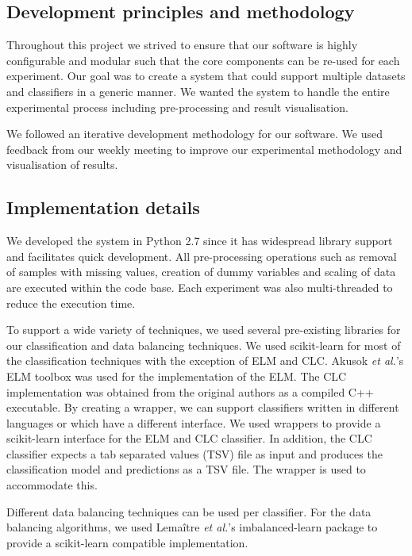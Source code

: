 \documentclass{sig-alternate-05-2015}
\begin{document}
	\subsection{Development principles and methodology}
	Throughout this project we strived to ensure that our software is highly configurable and modular such that the core components can be re-used for each experiment. Our goal was to create a system that could support multiple datasets and classifiers in a generic manner. We wanted the system to handle the entire experimental process including pre-processing and result visualisation.
	
	We followed an iterative development methodology for our software. We used feedback from our weekly meeting to improve our experimental methodology and visualisation of results.
	
	\subsection{Implementation details}
	We developed the system in Python 2.7 since it has widespread library support and facilitates quick development. All pre-processing operations such as removal of samples with missing values, creation of dummy variables and scaling of data are executed within the code base. Each experiment was also multi-threaded to reduce the execution time.
	
	To support a wide variety of techniques, we used several pre-existing libraries for our classification and data balancing techniques. We used scikit-learn \cite{scikit-learn} for most of the classification techniques with the exception of ELM and CLC. Akusok \textit{et al.}'s \cite{7140733} ELM toolbox was used for the implementation of the ELM. The CLC implementation was obtained from the original authors \cite{Chen2006} as a compiled C++ executable. By creating a wrapper, we can support classifiers written in different languages or which have a different interface. We used wrappers to provide a scikit-learn interface for the ELM and CLC classifier. In addition, the CLC classifier expects a tab separated values (TSV) file as input and produces the classification model and predictions as a TSV file. The wrapper is used to accommodate this.
	
	Different data balancing techniques can be used per classifier. For the data balancing algorithms, we used Lema\^{i}tre \textit{et al.}'s \cite{lemaitre2016imbalanced} imbalanced-learn package to provide a scikit-learn compatible implementation.
	
\end{document}
